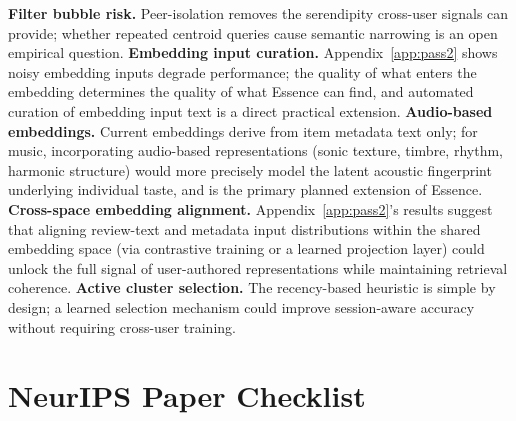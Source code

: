 \documentclass{article}
\begin{document}
\textbf{Filter bubble risk.} Peer-isolation removes the serendipity cross-user signals can provide; whether repeated centroid queries cause semantic narrowing is an open empirical question. \textbf{Embedding input curation.} Appendix~\ref{app:pass2} shows noisy embedding inputs degrade performance; the quality of what enters the embedding determines the quality of what Essence can find, and automated curation of embedding input text is a direct practical extension. \textbf{Audio-based embeddings.} Current embeddings derive from item metadata text only; for music, incorporating audio-based representations (sonic texture, timbre, rhythm, harmonic structure) would more precisely model the latent acoustic fingerprint underlying individual taste, and is the primary planned extension of Essence. \textbf{Cross-space embedding alignment.} Appendix~\ref{app:pass2}'s results suggest that aligning review-text and metadata input distributions within the shared embedding space (via contrastive training or a learned projection layer) could unlock the full signal of user-authored representations while maintaining retrieval coherence. \textbf{Active cluster selection.} The recency-based heuristic is simple by design; a learned selection mechanism could improve session-aware accuracy without requiring cross-user training.

\newpage
\section*{NeurIPS Paper Checklist}
\end{document}
